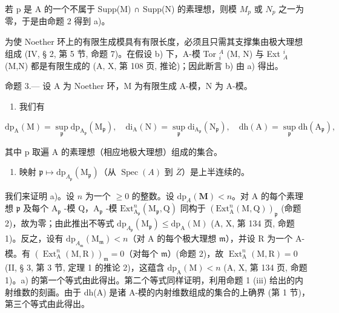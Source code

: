 若 p 是 A 的一个不属于 Supp(M) ∩ Supp(N) 的素理想，则模 \(M_{p}\) 或 \(N_{p}\) 之一为零，于是由命题 2 得到 a)。

为使 Noether 环上的有限生成模具有有限长度，必须且只需其支撑集由极大理想组成 (IV, § 2, 第 5 节, 命题 7)。在假设 b) 下，A-模 Tor \(_{i}^{A}\) (M, N) 与 Ext \(_{A}^{i}\) (M,N) 都是有限生成的 (A, X, 第 108 页, 推论)；因此断言 b) 由 a) 得出。

命题 3.--- 设 A 为 Noether 环，M 为有限生成 A-模，N 为 A-模。

\begin{enumerate}
\def\labelenumi{\alph{enumi})}
\tightlist
\item
  我们有
\end{enumerate}

\[
\mathrm{dp} _ {\mathrm{A}} (\mathrm{M}) = \sup _ {\mathfrak {p}} \mathrm{dp} _ {\mathrm{A} _ {\mathfrak {p}}} \left(\mathrm{M} _ {\mathfrak {p}}\right), \quad \mathrm{di} _ {\mathrm{A}} (\mathrm{N}) = \sup _ {\mathfrak {p}} \mathrm{di} _ {\mathrm{A} _ {\mathfrak {p}}} \left(\mathrm{N} _ {\mathfrak {p}}\right), \quad \mathrm{dh} (\mathrm{A}) = \sup _ {\mathfrak {p}} \mathrm{dh} \left(\mathrm{A} _ {\mathfrak {p}}\right),
\]

其中 p 取遍 A 的素理想（相应地极大理想）组成的集合。

\begin{enumerate}
\def\labelenumi{\alph{enumi})}
\setcounter{enumi}{1}
\tightlist
\item
  映射 \(\mathfrak{p} \mapsto \mathrm{dp}_{A_{\mathfrak{p}}}(\mathrm{M}_{\mathfrak{p}})\)（从 \(\operatorname{Spec}(A)\) 到 \(\overline{Z}\)）是上半连续的。
\end{enumerate}

我们来证明 a)。设 \(n\) 为一个 \(\geqslant 0\) 的整数。设 \(\mathrm{dp}_{A}(\mathbf{M}) < n\)。对 A 的每个素理想 \(\mathfrak{p}\) 及每个 \(\mathrm{A}_{\mathfrak{p}}\) -模 Q，\(\mathrm{A}_{\mathfrak{p}}\) -模 \(\mathrm{Ext}_{\mathrm{A}_{\mathfrak{p}}}^{n}(\mathrm{M}_{\mathfrak{p}},\mathrm{Q})\) 同构于 \((\mathrm{Ext}_{\mathrm{A}}^{n}(\mathrm{M},\mathrm{Q}))_{\mathfrak{p}}\) (命题 2)，故为零；由此推出不等式 \(\mathrm{dp}_{A_{\mathfrak{p}}}(\mathrm{M}_{\mathfrak{p}}) \leqslant \mathrm{dp}_{\mathrm{A}}(\mathrm{M})\) (A, X, 第 134 页, 命题 1)。反之，设有 \(\mathrm{dp}_{A_{\mathfrak{m}}}(\mathrm{M}_{\mathfrak{m}}) < n\)（对 A 的每个极大理想 \(\mathfrak{m}\)），并设 R 为一个 A-模。有 \((\operatorname{Ext}_{\mathrm{A}}^{n}(\mathrm{M}, \mathrm{R}))_{\mathfrak{m}} = 0\)（对每个 \(\mathfrak{m}\)）(命题 2)，故 \(\operatorname{Ext}_{\mathrm{A}}^{n}(\mathrm{M}, \mathrm{R}) = 0\) (II, § 3, 第 3 节, 定理 1 的推论 2)，这蕴含 \(\mathrm{dp}_{\mathrm{A}}(\mathrm{M}) < n\) (A, X, 第 134 页, 命题 1)。a) 的第一个等式由此得出。第二个等式同样证明，利用命题 1 (iii) 给出的内射维数的刻画。由于 dh(A) 是诸 A-模的内射维数组成的集合的上确界 (第 1 节)，第三个等式由此得出。

